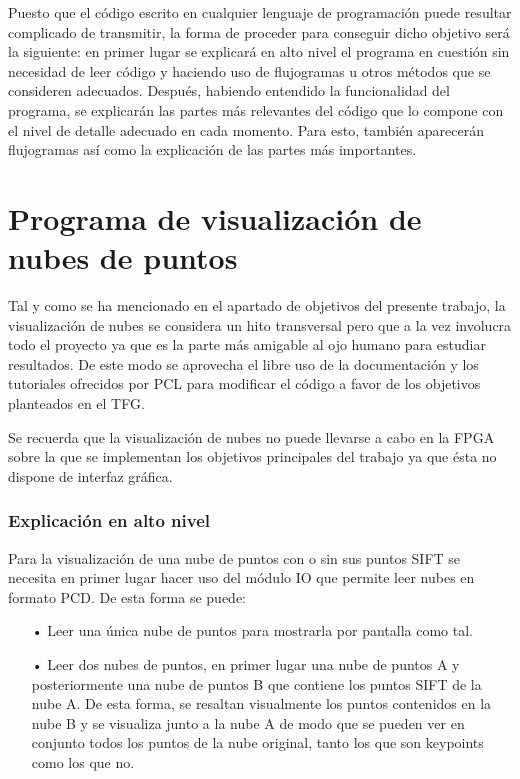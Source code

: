 Puesto que el código escrito en cualquier lenguaje de programación puede resultar complicado de transmitir, la forma de proceder para conseguir dicho objetivo será la siguiente: en primer lugar se explicará en alto nivel el programa en cuestión sin necesidad de leer código y haciendo uso de flujogramas u otros métodos que se consideren adecuados. Después, habiendo entendido la funcionalidad del programa, se explicarán las partes más relevantes del código que lo compone con el nivel de detalle adecuado en cada momento. Para esto, también aparecerán flujogramas así como la explicación de las partes más importantes.

 
\section{Programa de visualización de nubes de puntos}
Tal y como se ha mencionado en el apartado de objetivos del presente trabajo, la visualización de nubes se considera un hito transversal pero que a la vez involucra todo el proyecto ya que es la parte más amigable al ojo humano para estudiar resultados. De este modo se aprovecha el libre uso de la documentación y los tutoriales ofrecidos por PCL para modificar el código a favor de los objetivos planteados en el TFG.

Se recuerda que la visualización de nubes no puede llevarse a cabo en la FPGA sobre la que se implementan los objetivos principales del trabajo ya que ésta no dispone de interfaz gráfica.

\subsubsection{Explicación en alto nivel}
Para la visualización de una nube de puntos con o sin sus puntos SIFT se necesita en primer lugar hacer uso del módulo IO que permite leer nubes en formato PCD. De esta forma se puede:

\begin{itemize}
\item[•]Leer una única nube de puntos para mostrarla por pantalla como tal.
\item[•]Leer dos nubes de puntos, en primer lugar una nube de puntos A y posteriormente una nube de puntos B que contiene los puntos SIFT de la nube A. De esta forma, se resaltan visualmente los puntos contenidos en la nube B y se visualiza junto a la nube A de modo que se pueden ver en conjunto todos los puntos de la nube original, tanto los que son keypoints como los que no. 
\end{itemize}

